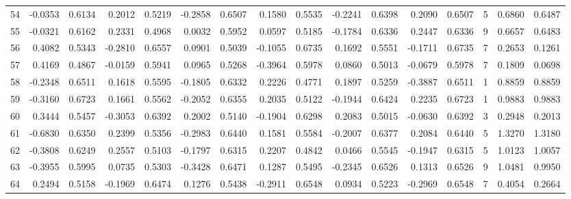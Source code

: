 \begin{tabular}{lrrrrrrrrrrrrrrr}
54  &     -0.0353 &  0.6134 &  0.2012 &  0.5219 & -0.2858 &  0.6507 &  0.1580 &  0.5535 & -0.2241 &  0.6398 &   0.2090 &     0.6507 &      5 &                    0.6860 &                     0.6487 \\
55  &     -0.0321 &  0.6162 &  0.2331 &  0.4968 &  0.0032 &  0.5952 &  0.0597 &  0.5185 & -0.1784 &  0.6336 &   0.2447 &     0.6336 &      9 &                    0.6657 &                     0.6483 \\
56  &      0.4082 &  0.5343 & -0.2810 &  0.6557 &  0.0901 &  0.5039 & -0.1055 &  0.6735 &  0.1692 &  0.5551 &  -0.1711 &     0.6735 &      7 &                    0.2653 &                     0.1261 \\
57  &      0.4169 &  0.4867 & -0.0159 &  0.5941 &  0.0965 &  0.5268 & -0.3964 &  0.5978 &  0.0860 &  0.5013 &  -0.0679 &     0.5978 &      7 &                    0.1809 &                     0.0698 \\
58  &     -0.2348 &  0.6511 &  0.1618 &  0.5595 & -0.1805 &  0.6332 &  0.2226 &  0.4771 &  0.1897 &  0.5259 &  -0.3887 &     0.6511 &      1 &                    0.8859 &                     0.8859 \\
59  &     -0.3160 &  0.6723 &  0.1661 &  0.5562 & -0.2052 &  0.6355 &  0.2035 &  0.5122 & -0.1944 &  0.6424 &   0.2235 &     0.6723 &      1 &                    0.9883 &                     0.9883 \\
60  &      0.3444 &  0.5457 & -0.3053 &  0.6392 &  0.2002 &  0.5140 & -0.1904 &  0.6298 &  0.2083 &  0.5015 &  -0.0630 &     0.6392 &      3 &                    0.2948 &                     0.2013 \\
61  &     -0.6830 &  0.6350 &  0.2399 &  0.5356 & -0.2983 &  0.6440 &  0.1581 &  0.5584 & -0.2007 &  0.6377 &   0.2084 &     0.6440 &      5 &                    1.3270 &                     1.3180 \\
62  &     -0.3808 &  0.6249 &  0.2557 &  0.5103 & -0.1797 &  0.6315 &  0.2207 &  0.4842 &  0.0466 &  0.5545 &  -0.1947 &     0.6315 &      5 &                    1.0123 &                     1.0057 \\
63  &     -0.3955 &  0.5995 &  0.0735 &  0.5303 & -0.3428 &  0.6471 &  0.1287 &  0.5495 & -0.2345 &  0.6526 &   0.1313 &     0.6526 &      9 &                    1.0481 &                     0.9950 \\
64  &      0.2494 &  0.5158 & -0.1969 &  0.6474 &  0.1276 &  0.5438 & -0.2911 &  0.6548 &  0.0934 &  0.5223 &  -0.2969 &     0.6548 &      7 &                    0.4054 &                     0.2664 \\

\end{tabular}
